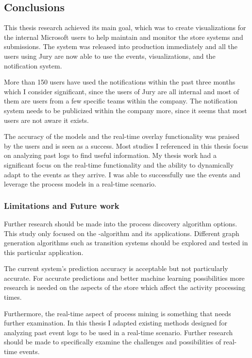 
\subsection{Conclusions} 
\label{sec:conclusions}

This thesis research achieved its main goal, which was to create visualizations for the internal Microsoft users to help maintain and monitor the store systems and submissions.
The system was released into production immediately and all the users using Jury are now able to use the events, visualizations, and the notification system.

More than 150 users have used the notifications within the past three months which I consider significant, 
since the users of Jury are all internal and most of them are users from a few specific teams within the company.
The notification system needs to be publicized within the company more, since it seems that most users are not aware it exists.

The accuracy of the models and the real-time overlay functionality was praised by the users and is seen as a success.
Most studies I referenced in this thesis focus on analyzing past logs to find useful information.
My thesis work had a significant focus on the real-time functionality and the ability to dynamically adapt to the events as they arrive.
I was able to successfully use the events and leverage the process models in a real-time scenario.

\subsubsection{Limitations and Future work}

Further research should be made into the process discovery algorithm options.
This study only focused on the \textalpha-algorithm and its applications. 
Different graph generation algorithms such as transition systems \cite{van2013discovering} should be explored and tested in this particular application.

The current system's prediction accuracy is acceptable but not particularly accurate.
For accurate predictions and better machine learning possibilities more research is needed on the aspects of the store which affect the activity processing times.

Furthermore, the real-time aspect of process mining is something that needs further examination. In this thesis I adapted existing methods designed for analyzing past event logs to be used in a real-time scenario.
Further research should be made to specifically examine the challenges and possibilities of real-time events.

